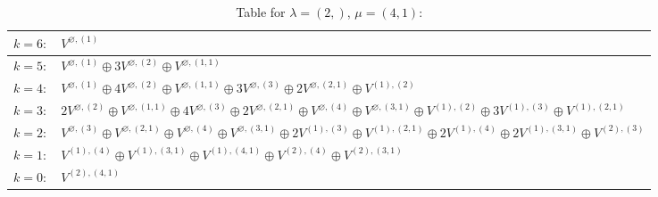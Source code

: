 \documentclass[a4paper,12pt]{article}
\begin{document}
\renewcommand{\arraystretch}{1.6} 
\begin{table}[H]
\centering
\caption{Table for $\lambda = (2,)$, $\mu = (4, 1)$:}
\begin{tabular}{|>{\centering\arraybackslash}p{15cm}|}
\hline
 $k = 6: \quad V^{\varnothing, (1)} $ \\ \hline
 $k = 5: \quad V^{\varnothing, (1)} \oplus 3 V^{\varnothing, (2)} \oplus V^{\varnothing, (1, 1)} $ \\ \hline
 $k = 4: \quad V^{\varnothing, (1)} \oplus 4 V^{\varnothing, (2)} \oplus V^{\varnothing, (1, 1)} \oplus 3 V^{\varnothing, (3)} \oplus 2 V^{\varnothing, (2, 1)} \oplus V^{(1), (2)} $ \\ \hline
 $k = 3: \quad 2 V^{\varnothing, (2)} \oplus V^{\varnothing, (1, 1)} \oplus 4 V^{\varnothing, (3)} \oplus 2 V^{\varnothing, (2, 1)} \oplus V^{\varnothing, (4)} \oplus V^{\varnothing, (3, 1)} \oplus V^{(1), (2)} \oplus 3 V^{(1), (3)} \oplus V^{(1), (2, 1)} $ \\ \hline
 $k = 2: \quad V^{\varnothing, (3)} \oplus V^{\varnothing, (2, 1)} \oplus V^{\varnothing, (4)} \oplus V^{\varnothing, (3, 1)} \oplus 2 V^{(1), (3)} \oplus V^{(1), (2, 1)} \oplus 2 V^{(1), (4)} \oplus 2 V^{(1), (3, 1)} \oplus V^{(2), (3)} $ \\ \hline
 $k = 1: \quad V^{(1), (4)} \oplus V^{(1), (3, 1)} \oplus V^{(1), (4, 1)} \oplus V^{(2), (4)} \oplus V^{(2), (3, 1)} $ \\ \hline
 $k = 0: \quad V^{(2), (4, 1)} $ \\ \hline
\end{tabular}
\end{table}
\end{document}
